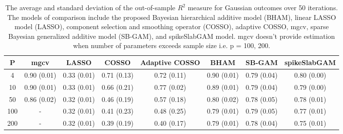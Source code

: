 \begin{table}[ht]
\centering
\begin{tabular}{cccccccc}
  \hline
P & mgcv & LASSO & COSSO & Adaptive COSSO & BHAM & SB-GAM & spikeSlabGAM \\ 
  \hline
  4 & 0.90 (0.01) & 0.33 (0.01) & 0.71 (0.13) & 0.72 (0.11) & 0.90 (0.01) & 0.79 (0.04) & 0.80 (0.00) \\ 
   10 & 0.90 (0.01) & 0.33 (0.01) & 0.66 (0.21) & 0.77 (0.02) & 0.89 (0.01) & 0.79 (0.04) & 0.79 (0.00) \\ 
   50 & 0.86 (0.02) & 0.32 (0.01) & 0.46 (0.19) & 0.57 (0.18) & 0.80 (0.02) & 0.78 (0.05) & 0.78 (0.01) \\ 
  100 & - & 0.32 (0.01) & 0.41 (0.23) & 0.48 (0.25) & 0.79 (0.01) & 0.79 (0.05) & 0.77 (0.01) \\ 
  200 & - & 0.32 (0.01) & 0.39 (0.19) & 0.40 (0.17) & 0.79 (0.01) & 0.78 (0.04) & 0.75 (0.01) \\ 
   \hline
\end{tabular}
\caption{The average and standard deviation of the out-of-sample $R^2$ measure for
    Gaussian outcomes over 50 iterations. The models of comparison include the proposed
    Bayesian hierarchical additive model (BHAM), linear LASSO model (LASSO), component
    selection and smoothing operator (COSSO), adaptive COSSO, mgcv, sparse Bayesian
    generalized additive model (SB-GAM), and spikeSlabGAM model. mgcv doesn't provide estimation
    when number of parameters exceeds sample size i.e. p = 100, 200.} 
\label{tab:gaus}
\end{table}
